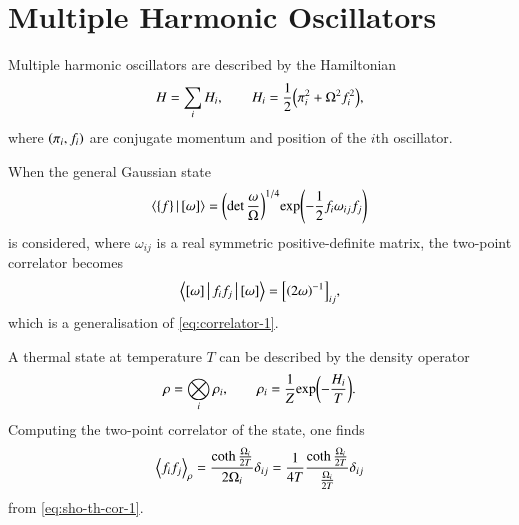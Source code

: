 \section{Multiple Harmonic Oscillators}

Multiple harmonic oscillators are described by the Hamiltonian
\begin{equation}
H = \sum_i H_i,\qquad H_i = \frac{1}{2}{\left(\pi_i^2 + \Omega^2f_i^2\right)},
\end{equation}
where ${\left(\pi_i, f_i\right)}$ are conjugate momentum and position of the $i$th
oscillator.

When the general Gaussian state
\begin{equation}
\Braket{{\left\{f\right\}} | {\left[\omega\right]}} = {\left(\det\frac{\omega}{\Omega}\right)}^{1/4} 
{\exp}\mathopen{}\left(-\frac{1}{2}f_i \omega_{ij} f_j\right)\mathclose{}
\label{eq:general-ij-omega}
\end{equation}
is considered, where $\omega_{ij}$ is a real symmetric positive-definite
matrix, the two-point correlator becomes
\begin{equation}
\Braket{{\left[\omega\right]} | f_i f_j | {\left[\omega\right]}} = {\left[{\left(2\omega\right)}^{-1}\right]}_{ij},
\label{eq:multi-har-cor}
\end{equation}
which is a generalisation of \cref{eq:correlator-1}.

A thermal state at temperature $T$ can be described by the density operator
\begin{equation}
\rho = \bigotimes_i \rho_i,\qquad \rho_i =
\frac{1}{Z} {\exp}\mathopen{}\left(-\frac{H_i}{T}\right)\mathclose{}.
\label{eq:multi-thermal-density-mat}
\end{equation}
Computing the two-point correlator of the state, one finds
\begin{equation}
{\left<f_if_j\right>}_\rho = \frac{\coth\frac{\Omega_i}{2T}}{2\Omega_i}
\delta_{ij}
= \frac{1}{4T} \frac{\coth\frac{\Omega_i}{2T}}{\frac{\Omega_i}{2T}} 
\delta_{ij}
\label{eq:correlator-multiple-thermal}
\end{equation}
from \cref{eq:sho-th-cor-1}.

